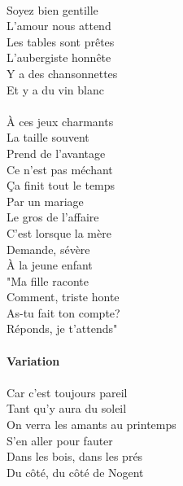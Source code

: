 \\Soyez bien gentille
\\L'amour nous attend
\\Les tables sont prêtes
\\L'aubergiste honnête
\\Y a des chansonnettes
\\Et y a du vin blanc
\\\\À ces jeux charmants
\\La taille souvent
\\Prend de l'avantage
\\Ce n'est pas méchant
\\Ça finit tout le temps
\\Par un mariage
\\Le gros de l'affaire
\\C'est lorsque la mère
\\Demande, sévère
\\À la jeune enfant
\\"Ma fille raconte
\\Comment, triste honte
\\As-tu fait ton compte?
\\Réponds, je t'attends"
\\\\\textbf{Variation}
\\\\Car c'est toujours pareil
\\Tant qu'y aura du soleil
\\On verra les amants au printemps
\\S'en aller pour fauter
\\Dans les bois, dans les prés
\\Du côté, du côté de Nogent

\breakpage